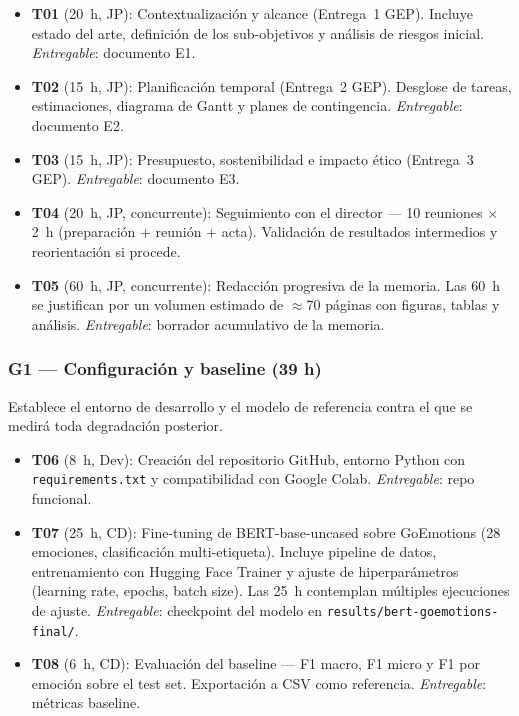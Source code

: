\documentclass[11pt, a4paper]{article}
\begin{document}
\begin{itemize}[nosep, leftmargin=1.2em, itemsep=2pt]
    \item \textbf{T01} (20~h, JP): Contextualización y alcance (Entrega~1 GEP). Incluye estado del arte, definición de los sub-objetivos y análisis de riesgos inicial. \textit{Entregable}: documento E1.
    \item \textbf{T02} (15~h, JP): Planificación temporal (Entrega~2 GEP). Desglose de tareas, estimaciones, diagrama de Gantt y planes de contingencia. \textit{Entregable}: documento E2.
    \item \textbf{T03} (15~h, JP): Presupuesto, sostenibilidad e impacto ético (Entrega~3 GEP). \textit{Entregable}: documento E3.
    \item \textbf{T04} (20~h, JP, concurrente): Seguimiento con el director --- 10 reuniones $\times$ 2~h (preparación + reunión + acta). Validación de resultados intermedios y reorientación si procede.
    \item \textbf{T05} (60~h, JP, concurrente): Redacción progresiva de la memoria. Las 60~h se justifican por un volumen estimado de $\approx$70 páginas con figuras, tablas y análisis. \textit{Entregable}: borrador acumulativo de la memoria.
\end{itemize}

\subsubsection{G1 --- Configuración y baseline (39 h)}

Establece el entorno de desarrollo y el modelo de referencia contra el que se medirá toda degradación posterior.

\begin{itemize}[nosep, leftmargin=1.2em, itemsep=2pt]
    \item \textbf{T06} (8~h, Dev): Creación del repositorio GitHub, entorno Python con \texttt{requirements.txt} y compatibilidad con Google Colab. \textit{Entregable}: repo funcional.
    \item \textbf{T07} (25~h, CD): Fine-tuning de BERT-base-uncased sobre GoEmotions (28 emociones, clasificación multi-etiqueta). Incluye pipeline de datos, entrenamiento con Hugging Face Trainer y ajuste de hiperparámetros (learning rate, epochs, batch size). Las 25~h contemplan múltiples ejecuciones de ajuste. \textit{Entregable}: checkpoint del modelo en \texttt{results/bert-goemotions-final/}.
    \item \textbf{T08} (6~h, CD): Evaluación del baseline --- F1 macro, F1 micro y F1 por emoción sobre el test set. Exportación a CSV como referencia. \textit{Entregable}: métricas baseline.
\end{itemize}
\end{document}
